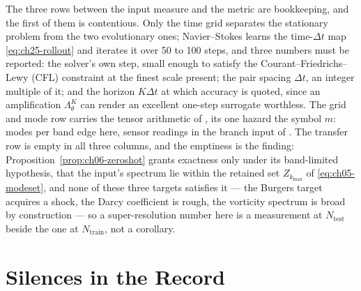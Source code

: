 The three rows between the input measure and the metric are bookkeeping, and the first of
them is contentious. Only the time grid separates the
stationary problem from the two evolutionary ones; Navier--Stokes learns the time-$\Delta t$
map \eqref{eq:ch25-rollout} and iterates it over 50 to 100 steps, and three numbers must be
reported: the solver's own step, small enough to satisfy the Courant--Friedrichs--Lewy (CFL)
constraint at the finest scale present; the pair spacing $\Delta t$, an integer multiple of
it; and the horizon $K\Delta t$ at which accuracy is quoted, since an amplification
$\Lambda_{\theta}^{K}$ can render an excellent one-step surrogate worthless. The grid and
mode row carries the tensor arithmetic of
, its one hazard the symbol
$m$: modes per band edge here, sensor readings in the branch input of
. The transfer row is empty in all three columns, and the
emptiness is the finding: Proposition~\ref{prop:ch06-zeroshot} grants exactness only under
its band-limited hypothesis, that the input's spectrum lie within the retained set
$Z_{k_{\max}}$ of \eqref{eq:ch05-modeset}, and none of these three targets satisfies
it --- the Burgers target acquires a shock, the Darcy coefficient is rough, the vorticity
spectrum is broad by construction --- so a super-resolution number here is a measurement at
$N_{\text{test}}$ beside the one at $N_{\text{train}}$, not a corollary.

\section{Silences in the Record}
\label{sec:appc-silences}

